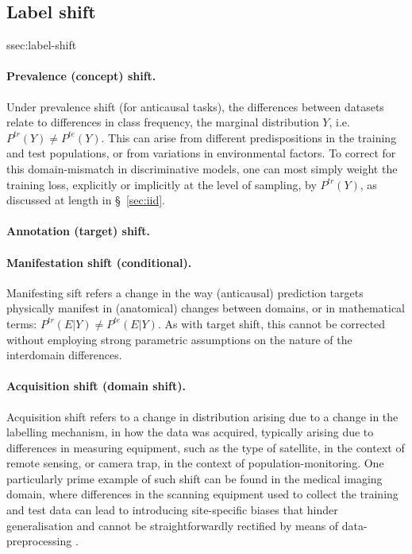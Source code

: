 \subsection{Label shift}{ssec:label-shift}
\paragraph{Prevalence (concept) shift.}
%
Under prevalence shift (for anticausal tasks), the differences between datasets relate to
differences in class frequency, the marginal distribution \wrt{} \(Y\), i.e. \( P^{tr}(Y) \neq
P^{te}(Y) \).
%
This can arise from different predispositions in the training and test populations, or from
variations in environmental factors.
%
To correct for this domain-mismatch in discriminative models, one can most simply weight the
training loss, explicitly or implicitly at the level of sampling, by \( P^{tr}(Y) \), as discussed
at length in \S~\ref{sec:iid}.
%
\paragraph{Annotation (target) shift.}

%
\paragraph{Manifestation shift (conditional).}
%
Manifesting sift refers a change in the way (anticausal) prediction targets physically manifest in
(anatomical) changes between domains, or in mathematical terms: \( P^{tr}(E | Y) \neq P^{te}(E | Y)
\).
%
As with target shift, this cannot be corrected without employing strong parametric assumptions on
the nature of the interdomain differences.
%
\paragraph{Acquisition shift (domain shift).}
%
Acquisition shift refers to a change in distribution arising due to a change in the labelling
mechanism, in how the data was acquired, typically arising due to differences in measuring
equipment, such as the type of satellite, in the context of remote sensing, or camera
trap, in the context of population-monitoring.
%
One particularly prime example of such shift can be found in the medical imaging domain, where
differences in the scanning equipment used to collect the training and test data can lead to
introducing site-specific biases that hinder generalisation and cannot be straightforwardly
rectified by means of data-preprocessing \citep{glocker2019machine}.

